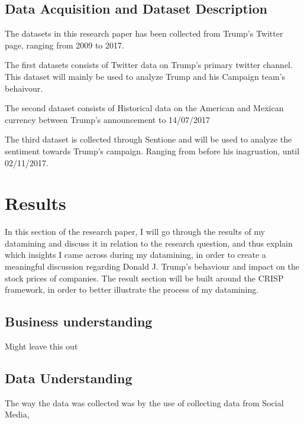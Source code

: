 \documentclass{article}
\begin{document}
\subsection{Data Acquisition and Dataset Description}
The datasets in this research paper has been collected from Trump's Twitter page, ranging from 2009 to 2017.

The first datasets consists of Twitter data on Trump's primary twitter channel.  This dataset will mainly be used to analyze Trump and his Campaign team's behaivour. 

The second dataset consists of Historical data on the American and Mexican currency between Trump's announcement to  14/07/2017

The third dataset is collected through Sentione and will be used to analyze the sentiment towards Trump's campaign. Ranging from before his inagruation, until 02/11/2017. 

\cleardoublepage


\section{Results}
In this section of the research paper, I will go through the results of my datamining and discuss it in relation to the research question, and thus explain which insights I came across during my datamining, in order to create a meaningful discussion regarding Donald J. Trump's behaviour and impact on the stock prices of companies. The result section will be built around the CRISP framework, in order to better illustrate the process of my datamining.

\subsection{Business understanding}
Might leave this out

\subsection{Data Understanding}
The way the data was collected was by the use of collecting data from Social Media,








\end{document}
